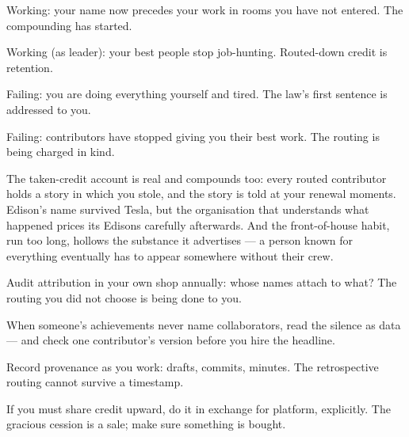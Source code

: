 \begin{feedback}
  \item Working: your name now precedes your work in rooms you have not entered. The compounding has started.
  \item Working (as leader): your best people stop job-hunting. Routed-down credit is retention.
  \item Failing: you are doing everything yourself and tired. The law's first sentence is addressed to you.
  \item Failing: contributors have stopped giving you their best work. The routing is being charged in kind.
\end{feedback}
\begin{failure}
The taken-credit account is real and compounds too: every routed contributor holds a story in which you stole, and the story is told at your renewal moments. Edison's name survived Tesla, but the organisation that understands what happened prices its Edisons carefully afterwards. And the front-of-house habit, run too long, hollows the substance it advertises --- a person known for everything eventually has to appear somewhere without their crew.
\end{failure}
\begin{countermeasures}
  \item Audit attribution in your own shop annually: whose names attach to what? The routing you did not choose is being done to you.
  \item When someone's achievements never name collaborators, read the silence as data --- and check one contributor's version before you hire the headline.
  \item Record provenance as you work: drafts, commits, minutes. The retrospective routing cannot survive a timestamp.
  \item If you must share credit upward, do it in exchange for platform, explicitly. The gracious cession is a sale; make sure something is bought.
\end{countermeasures}

\seesources
{}

